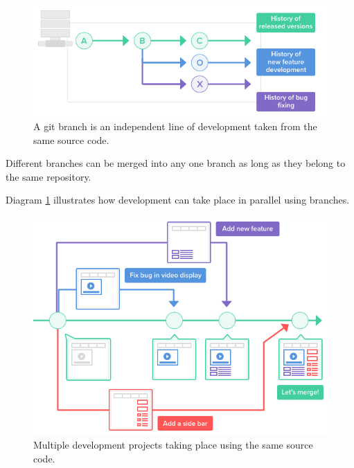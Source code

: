 \documentclass[10pt,a4paper,english]{report}
\begin{document}
    \begin{figure}[ht]
    \begin{center}
    \includegraphics[scale=0.5]{images/using_branches_001.png}
    \end{center}
    \caption{A git branch is an independent line of development taken from the same source code.}
    \end{figure}

    Different branches can be merged into any one branch as long as they belong to the same repository.

    Diagram \ref{fig:parallel-using-branches} illustrates how development can take place in parallel using branches.

    \begin{figure}[ht]
    \begin{center}
    \includegraphics[scale=0.5]{images/using_branches_002.png}
    \end{center}
    \caption{Multiple development projects taking place using the same source code.}
    \label{fig:parallel-using-branches}
    \end{figure}
\end{document}

